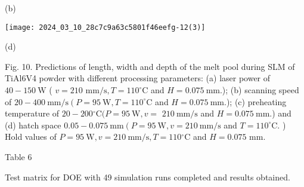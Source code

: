 \documentclass[10pt]{article}
\begin{document}
(b)

\begin{center}
\texttt{[image: 2024\_03\_10\_28c7c9a63c5801f46eefg-12(3)]}
\end{center}

(d)

Fig. 10. Predictions of length, width and depth of the melt pool during SLM of TiAl6V4 powder with different processing parameters: (a) laser power of $40-150 \mathrm{~W}$ ( $v=210$ $\mathrm{mm} / \mathrm{s}, T=110^{\circ} \mathrm{C}$ and $H=0.075 \mathrm{~mm}$.); (b) scanning speed of $20-400 \mathrm{~mm} / \mathrm{s}\left(P=95 \mathrm{~W}, T=110^{\circ} \mathrm{C}\right.$ and $H=0.075 \mathrm{~mm}$.); (c) preheating temperature of $20-200{ }^{\circ} \mathrm{C}(P=95 \mathrm{~W}, v=$ $210 \mathrm{~mm} / \mathrm{s}$ and $H=0.075 \mathrm{~mm}$.) and (d) hatch space $0.05-0.075 \mathrm{~mm}\left(P=95 \mathrm{~W}, v=210 \mathrm{~mm} / \mathrm{s}\right.$ and $T=110^{\circ} \mathrm{C}$. ) Hold values of $P=95 \mathrm{~W}, v=210 \mathrm{~mm} / \mathrm{s}, T=110{ }^{\circ} \mathrm{C}$ and $H=0.075$ $\mathrm{mm}$.

Table 6

Test matrix for DOE with 49 simulation runs completed and results obtained.
\end{document}
